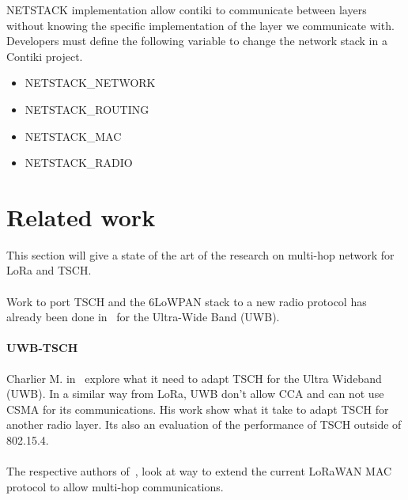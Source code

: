 NETSTACK implementation allow contiki to communicate between layers without 
knowing the specific implementation of the layer we communicate with.
Developers must define the following variable to change the network stack 
in a Contiki project.

\begin{itemize}
  \item NETSTACK\_NETWORK
  \item NETSTACK\_ROUTING
  \item NETSTACK\_MAC
  \item NETSTACK\_RADIO
\end{itemize}



\section{Related work}

This section will give a state of the art of the research on
multi-hop network for LoRa and TSCH.

\paragraph{}

Work to port TSCH and the 6LoWPAN stack to a new radio protocol has already 
been done in~\cite{uwbtsch} for the Ultra-Wide Band (UWB).


\paragraph{UWB-TSCH}

Charlier M. in~\cite{uwbtsch} explore what it need to adapt TSCH for the Ultra
Wideband (UWB). 
In a similar way from LoRa, UWB don't allow CCA and can not use CSMA for its 
communications.
His work show what it take to adapt TSCH for another radio layer. 
Its also an evaluation of the performance of TSCH outside of 802.15.4.

\paragraph{}

The respective authors of~\cite{DIAS2018424, 8856256}, look at way to extend
the current LoRaWAN MAC protocol to allow multi-hop communications.

